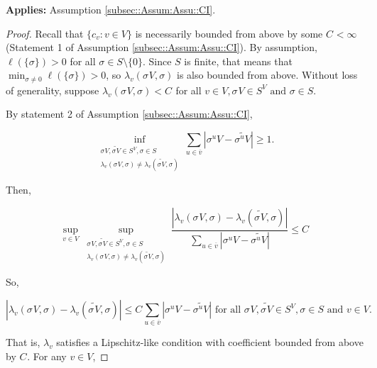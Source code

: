 \documentclass[12pt]{article}
\newcommand{\ov}{\overline}
\newcommand{\te}{\text}
\newcommand{\app}{\textbf{Applies: }}
\newcommand{\ind}{\hspace{24pt}}
\renewcommand{\v}{v}							%
\newcommand{\vv}{u}								%
\newcommand{\cl}{\ov}							%
\renewcommand{\S}{S}							%
\newcommand{\s}{\sigma}							%
\newcommand{\sv}[1]{\s^{#1}}					%
\newcommand{\V}{V}									%
\newcommand{\XState}[1]{\S^{#1}}				%
\newcommand{\IGr}[1]{c_{#1}}						%
\newcommand{\rate}[1]{\lambda_{#1}}					%
\newcommand{\const}[1]{C_{#1}}						%
\newcommand{\Sm}{\ell}								%
\newcommand{\alt}{\widetilde}						%
\begin{document}
\app Assumption \ref{subsec::Assum:Assu::CI}.

\begin{proof}
Recall that \(\{\IGr{\v}:\v\in\V\}\) is necessarily bounded from above by some \(\const{} < \infty\) (Statement 1 of Assumption \ref{subsec::Assum:Assu::CI}). By assumption, \(\Sm(\{\s\}) > 0\) for all \(\s \in \S\setminus \{0\}\). Since \(\S\) is finite, that means that \(\min_{\s \neq 0} \Sm(\{\s\}) > 0\), so \(\rate{\v}(\sv{}{\V},\s)\) is also bounded from above. Without loss of generality, suppose \(\rate{\v}(\sv{}{\V},\s) < \const{}\) for all \(\v\in \V,\sv{}{\V} \in \S^\V\te{ and } \s \in \S\).

\ind By statement 2 of Assumption \ref{subsec::Assum:Assu::CI}, 

\[\inf_{\substack{\sv{}{\V},\alt{\sv{}{\V}} \in \S^\V, \s\in \S\\ \rate{\v}(\sv{}{\V},\s) \neq \rate{\v}(\alt{\sv{}{\V}},\s)}} \sum_{\vv \in \cl{\v}} |\sv{\vv}{\V} - \alt{\sv{\vv}{\V}}| \geq 1.\]

Then,

\[\sup_{\v\in \V} \sup_{\substack{\sv{}{\V},\alt{\sv{}{\V}} \in \S^\V, \s\in \S\\ \rate{\v}(\sv{}{\V},\s) \neq \rate{\v}(\alt{\sv{}{\V}},\s)}} \frac{|\rate{\v}(\sv{}{\V},\s) - \rate{\v}(\alt{\sv{}{\V}},\s)|}{\sum_{\vv \in \cl{\v}} |\sv{\vv}{\V} - \alt{\sv{\vv}{\V}}|} \leq \const{}\]

So,

\[|\rate{\v}(\sv{}{\V},\s) - \rate{\v}(\alt{\sv{}{\V}},\s)|\leq \const{}\sum_{\vv \in \cl{\v}} |\sv{\vv}{\V} - \alt{\sv{\vv}{\V}}| \te{ for all } \sv{}{\V},\alt{\sv{}{\V}}\in \S^\V,\s\in \S\te{ and }\v\in \V.\]

That is, \(\rate{\v}\) satisfies a Lipschitz-like condition with coefficient bounded from above by \(\const{}\). For any \(\v\in \V\),


\end{proof}
\end{document}
